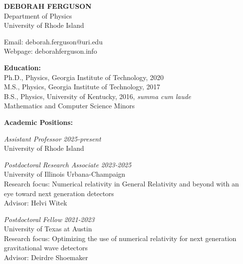 \documentclass[11pt]{article}
\begin{document}
%	
\begin{center}
  \textbf{DEBORAH FERGUSON}\\
  Department of Physics\\
  University of Rhode Island\\
\end{center}  

\begin{flushleft}

  Email: deborah.ferguson@uri.edu\\
  Webpage: deborahferguson.info\\
  \vspace{8px}
  
  \textbf{Education:}\\
  Ph.D., Physics, Georgia Institute of Technology, 2020\\
  M.S., Physics, Georgia Institute of Technology, 2017\\
  B.S., Physics, University of Kentucky, 2016, \textit{summa cum laude} \\ Mathematics and Computer Science Minors\\

\vspace{8px}

  \textbf{Academic Positions:}\\
  \vspace{4px}
  
  \textit{Assistant Professor} \hfill \textit{2025-present} \\
  University of Rhode Island\\
  
 \vspace{8px}    
  
  \textit{Postdoctoral Research Associate} \hfill \textit{2023-2025} \\
  University of Illinois Urbana-Champaign\\
  Research focus: Numerical relativity in General Relativity and beyond with an\\ eye toward next generation detectors\\
  Advisor: Helvi Witek\\
  
 \vspace{8px}  
 
  \textit{Postdoctoral Fellow} \hfill \textit{2021-2023} \\
  University of Texas at Austin\\
  Research focus: Optimizing the use of numerical relativity for next generation\\ gravitational wave detectors\\
  Advisor: Deirdre Shoemaker\\
  

\end{flushleft}
\end{document}
